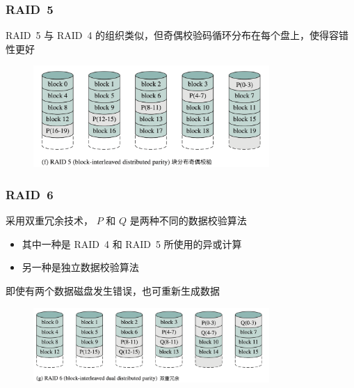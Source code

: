 \documentclass[cs4size,a4paper,10pt]{ctexart}
\begin{document}
	\subsubsection{RAID\ 5}
	RAID\ 5 与 RAID\ 4 的组织类似，但奇偶校验码循环分布在每个盘上，使得容错性更好
	\begin{figure}[H]
		\centering
		\includegraphics[width=0.8\textwidth]{img/RAID5}
	\end{figure}

	\subsubsection{RAID\ 6}
	采用双重冗余技术， $P$ 和 $Q$ 是两种不同的数据校验算法
	\begin{itemize}
		\item 其中一种是 RAID\ 4 和 RAID\ 5 所使用的异或计算
		\item 另一种是独立数据校验算法
	\end{itemize}
	即使有两个数据磁盘发生错误，也可重新生成数据
	\begin{figure}[H]
		\centering
		\includegraphics[width=0.8\textwidth]{img/RAID6}
	\end{figure}
\end{document}
